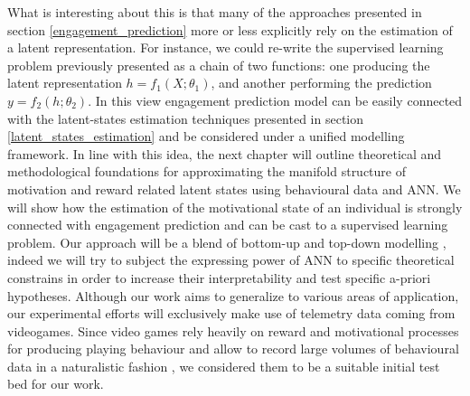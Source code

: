 What is interesting about this is that many of the approaches presented in section \ref{engagement_prediction} more or less explicitly rely on the estimation of a latent representation. For instance, we could re-write the supervised learning problem previously presented as a chain of two functions: one producing the latent representation $h = f_1(X; \theta_1)$, and another performing the prediction $y = f_2(h; \theta_2)$. In this view engagement prediction model can be easily connected with the latent-states estimation techniques presented in section \ref{latent_states_estimation} and be considered under a unified modelling framework. In line with this idea, the next chapter will outline theoretical and methodological foundations for approximating the manifold structure of motivation and reward related latent states using behavioural data and ANN.  We will show how the estimation of the motivational state of an individual is strongly connected with engagement prediction and can be cast to a supervised learning problem. Our approach will be a blend of bottom-up and top-down modelling \cite{yannakakis2013player}, indeed we will try to subject the expressing power of ANN to specific theoretical constrains in order to increase their interpretability and test specific a-priori hypotheses. Although our work aims to generalize to various areas of application, our experimental efforts will exclusively make use of telemetry data coming from videogames. Since video games rely heavily on reward and motivational processes for producing playing behaviour  \cite{chumbley2006affect,wang2011game,phillips2013videogame,avserivskis2017computational, agarwal2017quitting, steyvers2019joint} and allow to record large volumes of behavioural data in a naturalistic fashion \cite{drachen2015behavioral}, we considered them to be a suitable initial test bed for our work. \\



